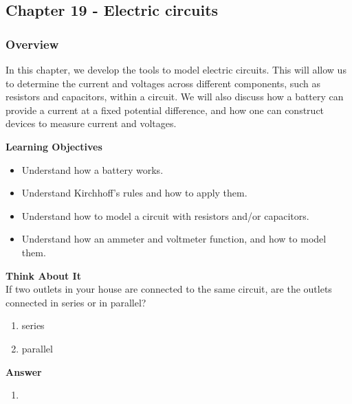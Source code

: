 \subsection{Chapter 19 - Electric circuits}

\subsubsection{Overview}\label{chapter:circuits}

In this chapter, we develop the tools to model electric circuits. This will allow us to determine the current and voltages across different components, such as resistors and capacitors, within a circuit. We will also discuss how a battery can provide a current at a fixed potential difference, and how one can construct devices to measure current and voltages.

\begin{framed}
\textbf{Learning Objectives}\\
\begin{itemize}
\item Understand how a battery works.
\item Understand Kirchhoff's rules and how to apply them.
\item Understand how to model a circuit with resistors and/or capacitors.
\item Understand how an ammeter and voltmeter function, and how to model them.
\end{itemize}
\end{framed}

\begin{framed}
\textbf{Think About It}\\
If two outlets in your house are connected to the same circuit, are the outlets connected in series or in parallel?

\begin{enumerate}
\item series
\item parallel
\end{enumerate}

\begin{framed}
\textbf{Answer}\\
\begin{enumerate}[resume]
\item
\end{enumerate}
\end{framed}
\end{framed}

